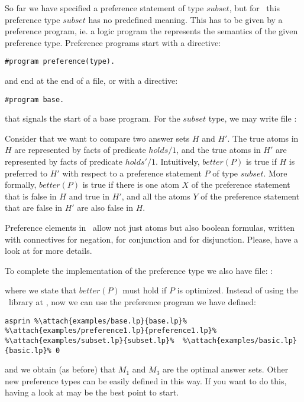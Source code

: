 So far we have specified a preference statement of type $subset$, 
but for \asprin\ this preference type $subset$ has no predefined meaning. 
This has to be given by a preference program,  ie. a logic program the represents the semantics of the given preference type. 
Preference programs start with a directive: 
\begin{lstlisting}[numbers=none]
#program preference(type).
\end{lstlisting}
and end at the end of a file, or with a directive:  
\begin{lstlisting}[numbers=none]
#program base.
\end{lstlisting}
that signals the start of a base program. 
For the $subset$ type, we may write file 
: 

Consider that we want to compare two answer sets $H$ and $H'$. 
The true atoms in $H$ are represented by facts of predicate $holds/1$,  and the true atoms in $H'$ are represented by facts of predicate $holds'/1$. 
Intuitively, $better(P)$ is true if $H$ is preferred to $H'$ with respect to a preference statement $P$ of type $subset$. 
More formally, 
$better(P)$ is true if there is one atom $X$ of the preference statement that is false in $H$ and true in $H'$, 
and all the atoms $Y$ of the preference statement that are false in $H'$ are also false in $H$.  

\begin{note}
Preference elements in \asprin\ allow not just atoms 
but also boolean formulas, written with connectives \code{\~} for negation, 
\code{\&} for conjunction and \code{|} for disjunction.
Please, have a look at \cite{brderosc15a} for more details. 
\end{note}

To complete the implementation of the preference type we also have file: 
: 

where we state that $better(P)$ must hold if $P$ is optimized. 
Instead of using the \asprin\ library at , 
now we can use the preference program we have defined:
\begin{lstlisting}[numbers=none,escapechar=\%]
asprin %\attach{examples/base.lp}{base.lp}% %\attach{examples/preference1.lp}{preference1.lp}%  %\attach{examples/subset.lp}{subset.lp}%  %\attach{examples/basic.lp}{basic.lp}% 0
\end{lstlisting}
and we obtain (as before) that $M_1$ and $M_3$ are the optimal answer sets.
Other new preference types can be easily defined in this way.  
If you want to do this, having a look at  may be the best point to start. 

